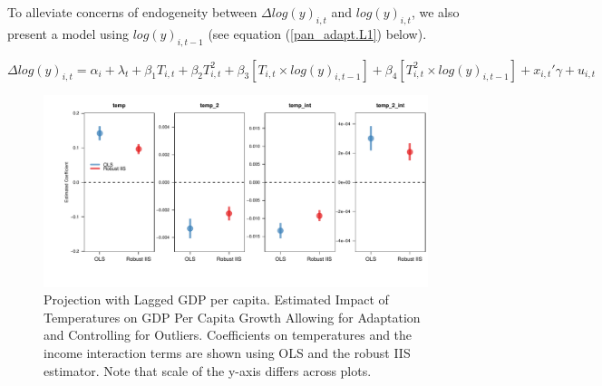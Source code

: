 \documentclass[11pt, letterpaper]{article}
\numberwithin{algorithm}{section}
\numberwithin{assumption}{section}
\numberwithin{lemma}{section}
\numberwithin{theorem}{section}
\numberwithin{corollary}{section}
\numberwithin{remark}{section}
\numberwithin{equation}{section}
\numberwithin{figure}{section}
\numberwithin{table}{section}
\begin{document}
To alleviate concerns of endogeneity between $\Delta log(y)_{i,t}$ and $log(y)_{i, t}$, we also present a model using $log(y)_{i, t-1}$ (see equation (\ref{pan_adapt.L1}) below).

\begin{small}
\begin{equation}
\label{pan_adapt.L1}
\Delta log(y)_{i,t} = \alpha_i + \lambda_t + \beta_1 T_{i,t} + \beta_2 T^2_{i,t} + \beta_3 \left[ T_{i,t} \times  log(y)_{i, t-1} \right] + \beta_4 \left[  T^2_{i,t} \times  log(y)_{i, t-1} \right] + x_{i,t}'\gamma + u_{i,t}
\end{equation}
\end{small}



\begin{figure}[!htbp]  %
\centering
\includegraphics[width = \textwidth]{coef.adapt.L1.pdf}
\caption{Projection with Lagged GDP per capita. Estimated Impact of Temperatures on GDP Per Capita Growth Allowing for Adaptation and Controlling for Outliers. Coefficients on temperatures and the income interaction terms are shown using OLS and the robust IIS estimator. Note that scale of the y-axis differs across plots.}
\label{fig_dist_coef_app1_appendix}
\end{figure}
\end{document}
